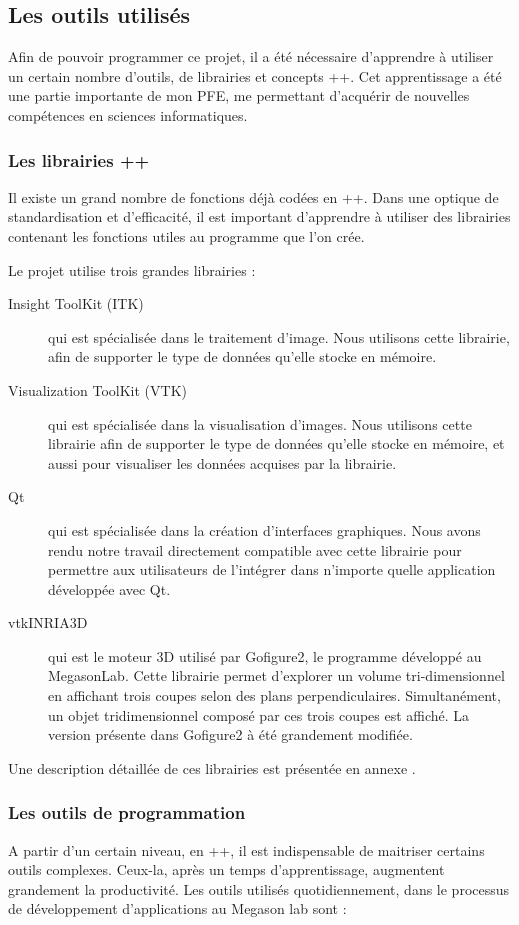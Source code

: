\subsection{Les outils utilisés}
Afin de pouvoir programmer ce projet,
il a été nécessaire d'apprendre à utiliser un certain nombre d'outils,
de librairies et concepts {\C++}. Cet apprentissage a été une
partie importante de mon PFE, me permettant d'acquérir de
nouvelles compétences en sciences informatiques.
\subsubsection{Les librairies \C++}
Il existe un grand nombre de fonctions déjà codées en {\C++}.
Dans une optique de standardisation et d'efficacité, il est important d'apprendre
à utiliser des librairies contenant les fonctions utiles au programme que l'on crée.

Le projet utilise trois grandes librairies :
\begin{description}
  \item[Insight ToolKit (ITK)] qui est spécialisée dans le traitement d'image. Nous utilisons cette librairie, 
  afin de supporter le type de données qu'elle stocke en mémoire.
  \item[Visualization ToolKit (VTK)] qui est spécialisée dans la visualisation d'images. 
  Nous utilisons cette librairie afin de supporter le type de données qu'elle stocke en mémoire,
  et aussi pour visualiser les données acquises par la librairie.
  \item[Qt]\cite{refQT} qui est spécialisée dans la création d'interfaces graphiques. 
  Nous avons rendu notre travail directement compatible avec cette librairie
  pour permettre aux utilisateurs de l'intégrer dans n'importe quelle application développée avec Qt.
  \item[vtkINRIA3D]{\cite{vtkINRIA}} qui est le moteur 3D utilisé par Gofigure2\cite{refGofigure2},
  le programme développé au MegasonLab.
  Cette librairie permet d'explorer un volume tri-dimensionnel en affichant trois coupes selon des plans perpendiculaires.
  Simultanément, un objet tridimensionnel composé par ces trois coupes est affiché.
  La version présente dans Gofigure2 à été grandement modifiée.
\end{description}
Une description détaillée de ces librairies est présentée en annexe \label{AnnexeDescriptionITKVTKQT}.


\subsubsection{Les outils de programmation}
A partir d'un certain niveau, en {\C++}, il est indispensable de maitriser certains outils complexes. Ceux-la, après un temps
 d'apprentissage, augmentent grandement la productivité.
Les outils utilisés quotidiennement, dans le processus de développement d'applications au Megason lab sont :


